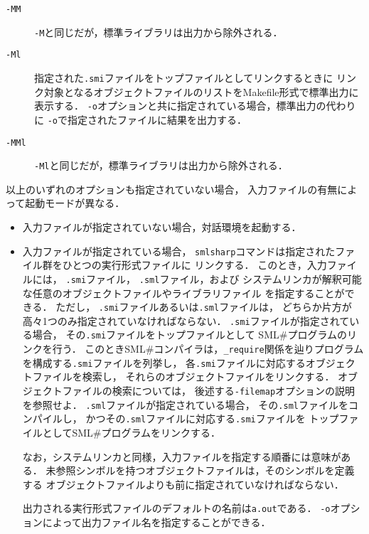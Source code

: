 \documentclass{jbook}
\newcommand{\smlsharp}{SML\#}
\begin{document}
\begin{description}
\item[{\tt -MM}]
	{\tt -M}と同じだが，標準ライブラリは出力から除外される．

\item[{\tt -Ml}]
	指定された{\tt .smi}ファイルをトップファイルとしてリンクするときに
リンク対象となるオブジェクトファイルのリストをMakefile形式で標準出力に
表示する．
	{\tt -o}オプションと共に指定されている場合，標準出力の代わりに
{\tt -o}で指定されたファイルに結果を出力する．

\item[{\tt -MMl}]
	{\tt -Ml}と同じだが，標準ライブラリは出力から除外される．

\end{description}

	以上のいずれのオプションも指定されていない場合，
入力ファイルの有無によって起動モードが異なる．
\begin{itemize}
\item
	入力ファイルが指定されていない場合，対話環境を起動する．
\item
	入力ファイルが指定されている場合，
{\tt smlsharp}コマンドは指定されたファイル群をひとつの実行形式ファイルに
リンクする．
	このとき，入力ファイルには，
{\tt .smi}ファイル，
{\tt .sml}ファイル，および
システムリンカが解釈可能な任意のオブジェクトファイルやライブラリファイル
を指定することができる．
	ただし，
{\tt .smi}ファイルあるいは{\tt .sml}ファイルは，
どちらか片方が高々1つのみ指定されていなければならない．
	{\tt .smi}ファイルが指定されている場合，
その{\tt .smi}ファイルをトップファイルとして
\smlsharp{}プログラムのリンクを行う．
	このとき\smlsharp{}コンパイラは，{\tt \_require}関係を辿りプログラム
を構成する{\tt .smi}ファイルを列挙し，
各{\tt .smi}ファイルに対応するオブジェクトファイルを検索し，
それらのオブジェクトファイルをリンクする．
	オブジェクトファイルの検索については，
後述する{\tt -filemap}オプションの説明を参照せよ．
	{\tt .sml}ファイルが指定されている場合，
その{\tt .sml}ファイルをコンパイルし，
かつその{\tt .sml}ファイルに対応する{\tt .smi}ファイルを
トップファイルとして\smlsharp{}プログラムをリンクする．

	なお，システムリンカと同様，入力ファイルを指定する順番には意味がある．
	未参照シンボルを持つオブジェクトファイルは，そのシンボルを定義する
オブジェクトファイルよりも前に指定されていなければならない．

	出力される実行形式ファイルのデフォルトの名前は{\tt a.out}である．
        {\tt -o}オプションによって出力ファイル名を指定することができる．
\end{itemize}
\end{document}
